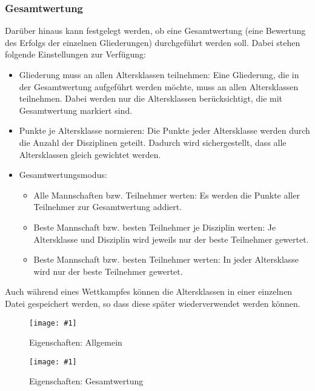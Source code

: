 \documentclass[11pt,a4paper,twoside,ngerman]{article}
\newcommand{\hsmimage}[3]{\begin{figure}[!ht]\centering\texttt{[image: \#1]}\caption{#3}\end{figure}}
\begin{document}
\subsubsection*{Gesamtwertung}
Darüber hinaus kann festgelegt werden, ob eine Gesamtwertung (eine Bewertung des Erfolgs der einzelnen Gliederungen) durchgeführt werden soll. Dabei stehen folgende Einstellungen zur Verfügung:
\begin{itemize}

\item \glqq{}Gliederung muss an allen Altersklassen teilnehmen\grqq{}: Eine Gliederung, die in der Gesamtwertung aufgeführt werden möchte, muss an allen Altersklassen teilnehmen. Dabei werden nur die Altersklassen berücksichtigt, die mit \glqq{}Gesamtwertung\grqq{} markiert sind.


\item \glqq{}Punkte je Altersklasse normieren\grqq{}: Die Punkte jeder Altersklasse werden durch die Anzahl der Disziplinen geteilt. Dadurch wird sichergestellt, dass alle Altersklassen gleich gewichtet werden.


\item Gesamtwertungsmodus:
\begin{itemize}

\item \glqq{}Alle Mannschaften bzw. Teilnehmer werten\grqq{}: Es werden die Punkte aller Teilnehmer zur Gesamtwertung addiert.


\item \glqq{}Beste Mannschaft bzw. besten Teilnehmer je Disziplin werten\grqq{}: Je Altersklasse und Disziplin wird jeweils nur der beste Teilnehmer gewertet.


\item \glqq{}Beste Mannschaft bzw. besten Teilnehmer werten\grqq{}: In jeder Altersklasse wird nur der beste Teilnehmer gewertet.


\end{itemize}



\end{itemize}


Auch während eines Wettkampfes können die Altersklassen in einer einzelnen Datei gespeichert werden, so dass diese später wiederverwendet werden können.


\hsmimage{pics/aks-eigenschaften-1}{.80\textwidth}{Eigenschaften: Allgemein}

\hsmimage{pics/aks-eigenschaften-2}{.80\textwidth}{Eigenschaften: Gesamtwertung}
\end{document}
